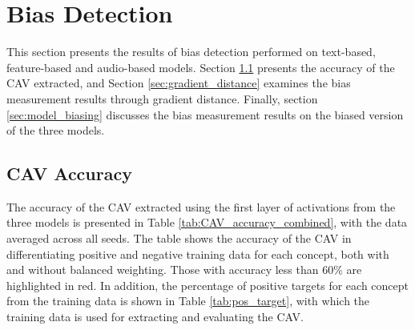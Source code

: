 \section{Bias Detection} \label{sec:bias_detection}
This section presents the results of bias detection performed on text-based, feature-based and audio-based models. Section \ref{sec:cav_accuracy} presents the accuracy of the CAV extracted, and Section \ref{sec:gradient_distance} examines the bias measurement results through gradient distance. Finally, section \ref{sec:model_biasing} discusses the bias measurement results on the biased version of the three models.

\subsection{CAV Accuracy} \label{sec:cav_accuracy}
The accuracy of the CAV extracted using the first layer of activations from the three models is presented in Table \ref{tab:CAV_accuracy_combined}, with the data averaged across all seeds. The table shows the accuracy of the CAV in differentiating positive and negative training data for each concept, both with and without balanced weighting. Those with accuracy less than 60\% are highlighted in red. In addition, the percentage of positive targets for each concept from the training data is shown in Table \ref{tab:pos_target}, with which the training data is used for extracting and evaluating the CAV.

